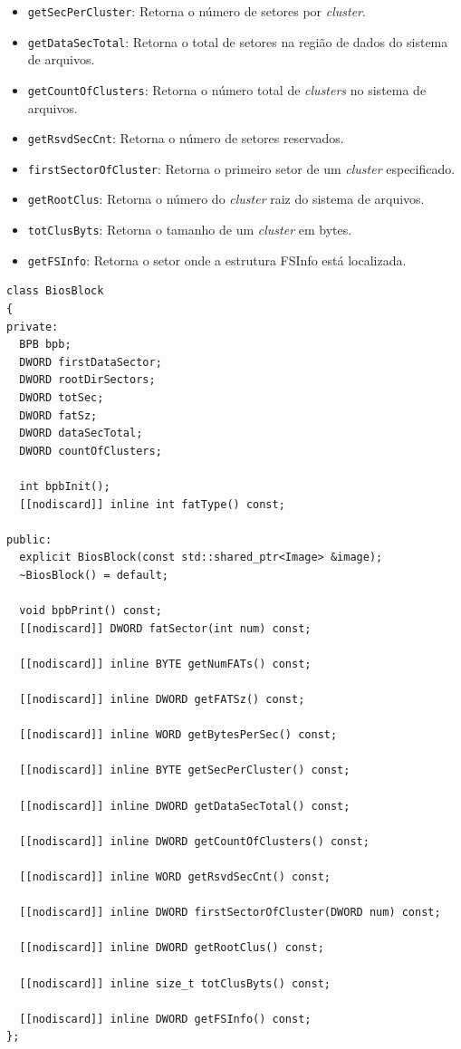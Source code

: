 \documentclass[
    12pt,				%
    oneside,   	        %
    a4paper,			%
    english,			%
    french,				%
    spanish,			%
    brazil,				%
    ]{pacotes/abntex2}
\begin{document}
\begin{itemize}
\begin{itemize}
            \item \texttt{getSecPerCluster}: Retorna o número de setores por \textit{cluster}.
            \item \texttt{getDataSecTotal}: Retorna o total de setores na região de dados do sistema de arquivos.
            \item \texttt{getCountOfClusters}: Retorna o número total de \textit{clusters} no sistema de arquivos.
            \item \texttt{getRsvdSecCnt}: Retorna o número de setores reservados.
            \item \texttt{firstSectorOfCluster}: Retorna o primeiro setor de um \textit{cluster} especificado.
            \item \texttt{getRootClus}: Retorna o número do \textit{cluster} raiz do sistema de arquivos.
            \item \texttt{totClusByts}: Retorna o tamanho de um \textit{cluster} em bytes.
            \item \texttt{getFSInfo}: Retorna o setor onde a estrutura FSInfo está localizada.
        \end{itemize}
\end{itemize}

\begin{lstlisting}[caption={Classe que abstrai a extração de informações da estrutura BPB}, label={lst:biosblock}]
class BiosBlock
{
private:
  BPB bpb;
  DWORD firstDataSector;
  DWORD rootDirSectors;
  DWORD totSec;
  DWORD fatSz;
  DWORD dataSecTotal;
  DWORD countOfClusters;

  int bpbInit();
  [[nodiscard]] inline int fatType() const;

public:
  explicit BiosBlock(const std::shared_ptr<Image> &image);
  ~BiosBlock() = default;

  void bpbPrint() const;
  [[nodiscard]] DWORD fatSector(int num) const;
  
  [[nodiscard]] inline BYTE getNumFATs() const;
  
  [[nodiscard]] inline DWORD getFATSz() const;
  
  [[nodiscard]] inline WORD getBytesPerSec() const;
  
  [[nodiscard]] inline BYTE getSecPerCluster() const;
  
  [[nodiscard]] inline DWORD getDataSecTotal() const;
  
  [[nodiscard]] inline DWORD getCountOfClusters() const;
  
  [[nodiscard]] inline WORD getRsvdSecCnt() const;
  
  [[nodiscard]] inline DWORD firstSectorOfCluster(DWORD num) const;
  
  [[nodiscard]] inline DWORD getRootClus() const;
  
  [[nodiscard]] inline size_t totClusByts() const;
  
  [[nodiscard]] inline DWORD getFSInfo() const;
};
\end{lstlisting}
\end{document}
